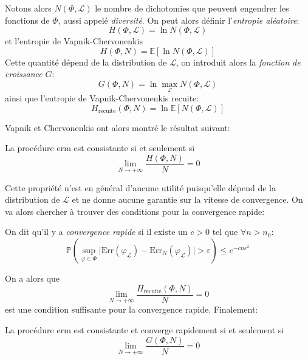 Notons alors $N(\Phi,\mathcal{L})$ le nombre de dichotomies que peuvent engendrer les fonctions de $\Phi$, aussi appelé \emph{diversité}. On peut alors définir l'\emph{entropie aléatoire}:
\begin{equation*}
    H( \Phi,\mathcal{L} ) = \ln N( \Phi,\mathcal{L} )
\end{equation*}
et l'entropie de Vapnik-Chervonenkis
\begin{equation*}
    H(\Phi,N) = \mathbb{E} \left[ \ln N( \Phi,\mathcal{L} ) \right]
\end{equation*}
Cette quantité dépend de la distribution de $\mathcal{L}$, on introduit alors la \emph{fonction de croissance} $G$:
\begin{equation*}
    G(\Phi,N) = \ln \max_{\mathcal{L}} N(\Phi,\mathcal{L} ) 
\end{equation*}
ainsi que l'entropie de Vapnik-Chervonenkis recuite:
\begin{equation*}
    H_{\text{recuite}} (\Phi,N) = \ln \mathbb{E} \left[ N(\Phi,\mathcal{L} ) \right]
\end{equation*}

Vapnik et Chervonenkis ont alors montré le résultat suivant:

\begin{prop}
    La procédure \ac{erm} est consistante si et seulement si
    \begin{equation*}
        \lim_{N \to +\infty} \frac{H(\Phi,N)}{N} = 0
    \end{equation*}    
\end{prop}

Cette propriété n'est en général d'aucune utilité puisqu'elle dépend de la distribution de $\mathcal{L}$ et ne donne aucune garantie sur la vitesse de convergence. On va alors chercher à trouver des conditions pour la convergence rapide:

\begin{definition}
    On dit qu'il y a \emph{convergence rapide} si il existe un $c > 0$ tel que $\forall n > n_0$:
    \begin{equation*}
        \mathbb{P} \left( \sup_{\varphi \in \Phi} \vert \mathrm{Err} ( \varphi_{\mathcal{L}} ) - \mathrm{Err}_N ( \varphi_{\mathcal{L}} ) \vert > \varepsilon \right) \leq e^{-c n \varepsilon^2}
    \end{equation*}
\end{definition}
On a alors que
\begin{equation*}
    \lim_{N \to +\infty} \frac{H_{\text{recuite}}(\Phi,N)}{N} = 0
\end{equation*}
est une condition suffisante pour la convergence rapide. Finalement:
\begin{theoreme}
    La procédure \ac{erm} est consistante et converge rapidement si et seulement si
    \begin{equation*}
        \lim_{N \to +\infty} \frac{G(\Phi,N)}{N} = 0
    \end{equation*}
\end{theoreme}

